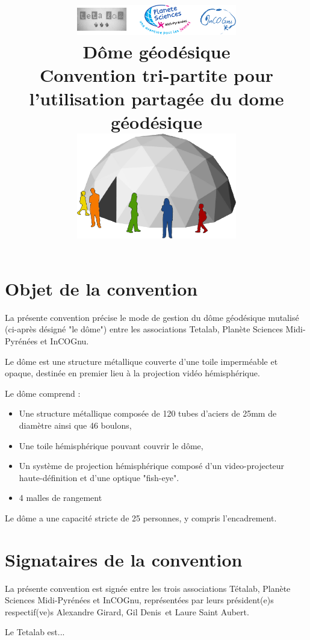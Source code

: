 \documentclass[a4paper,12pt]{article}
\title{
	\includegraphics[width=7cm]{logos.pdf}\\
	\vfill
	\LARGE{\textbf{Dôme géodésique}}\\[1cm]
	\large{Convention tri-partite pour l'utilisation partagée du dome géodésique}\\[1cm]
	\includegraphics[width=7cm]{general.pdf}\\
	\vfill
}
\newcommand{\presidentplasci}{Gil Denis}
\newcommand{\presidentincognu}{Laure Saint Aubert}
\newcommand{\presidenttetalab}{Alexandre Girard}
\begin{document}
\maketitle
\clearpage
\tableofcontents


\section{Objet de la convention}

La présente convention précise le mode de gestion du dôme géodésique mutalisé
(ci-après désigné "le dôme") entre les associations Tetalab, Planète Sciences
Midi-Pyrénées et InCOGnu.

Le dôme est une structure métallique couverte d'une toile imperméable et
opaque, destinée en premier lieu à la projection vidéo hémisphérique.

Le dôme comprend :

\begin{itemize}

	\item Une structure métallique composée de 120 tubes d'aciers
de 25mm de diamètre ainsi que 46 boulons,

	\item Une toile hémisphérique pouvant couvrir le dôme,

	\item Un système de projection hémisphérique composé d'un video-projecteur
	haute-définition et d'une optique "fish-eye".

	\item 4 malles de rangement

\end{itemize}


Le dôme a une capacité stricte de 25 personnes, y compris l'encadrement.

\section{Signataires de la convention}

La présente convention est signée entre les trois associations Tétalab, Planète
Sciences Midi-Pyrénées et InCOGnu, représentées par leurs président(e)s
respectif(ve)s \presidenttetalab, \presidentplasci~et \presidentincognu.

Le Tetalab est...
\end{document}
